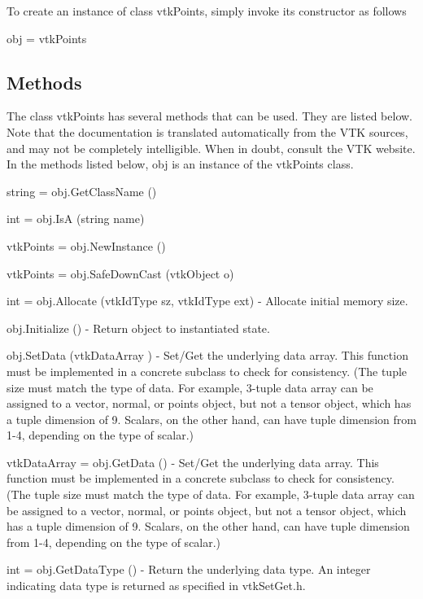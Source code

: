 To create an instance of class vtk\-Points, simply invoke its constructor as follows \begin{DoxyVerb}  obj = vtkPoints
\end{DoxyVerb}
 \hypertarget{vtkwidgets_vtkxyplotwidget_Methods}{}\subsection{Methods}\label{vtkwidgets_vtkxyplotwidget_Methods}
The class vtk\-Points has several methods that can be used. They are listed below. Note that the documentation is translated automatically from the V\-T\-K sources, and may not be completely intelligible. When in doubt, consult the V\-T\-K website. In the methods listed below, {\ttfamily obj} is an instance of the vtk\-Points class. 
\begin{DoxyItemize}
\item {\ttfamily string = obj.\-Get\-Class\-Name ()}  
\item {\ttfamily int = obj.\-Is\-A (string name)}  
\item {\ttfamily vtk\-Points = obj.\-New\-Instance ()}  
\item {\ttfamily vtk\-Points = obj.\-Safe\-Down\-Cast (vtk\-Object o)}  
\item {\ttfamily int = obj.\-Allocate (vtk\-Id\-Type sz, vtk\-Id\-Type ext)} -\/ Allocate initial memory size.  
\item {\ttfamily obj.\-Initialize ()} -\/ Return object to instantiated state.  
\item {\ttfamily obj.\-Set\-Data (vtk\-Data\-Array )} -\/ Set/\-Get the underlying data array. This function must be implemented in a concrete subclass to check for consistency. (The tuple size must match the type of data. For example, 3-\/tuple data array can be assigned to a vector, normal, or points object, but not a tensor object, which has a tuple dimension of 9. Scalars, on the other hand, can have tuple dimension from 1-\/4, depending on the type of scalar.)  
\item {\ttfamily vtk\-Data\-Array = obj.\-Get\-Data ()} -\/ Set/\-Get the underlying data array. This function must be implemented in a concrete subclass to check for consistency. (The tuple size must match the type of data. For example, 3-\/tuple data array can be assigned to a vector, normal, or points object, but not a tensor object, which has a tuple dimension of 9. Scalars, on the other hand, can have tuple dimension from 1-\/4, depending on the type of scalar.)  
\item {\ttfamily int = obj.\-Get\-Data\-Type ()} -\/ Return the underlying data type. An integer indicating data type is returned as specified in vtk\-Set\-Get.\-h.  

\end{DoxyItemize}
